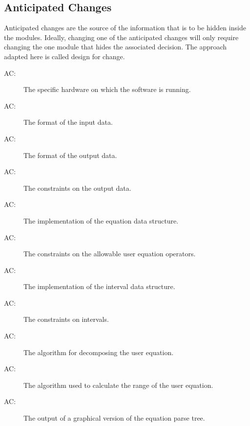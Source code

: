 \documentclass[12pt, titlepage]{article}
\newcounter{acnum}
\newcommand{\actheacnum}{AC\theacnum}
\begin{document}
\subsection{Anticipated Changes} \label{SecAchange}

Anticipated changes are the source of the information that is to be hidden
inside the modules. Ideally, changing one of the anticipated changes will only
require changing the one module that hides the associated decision. The approach
adapted here is called design for change.

\begin{description}
\item[ \actheacnum \label{acHardware}:] The specific
  hardware on which the software is running.
  
\item[ \actheacnum \label{acInput}:] The format of 
the input data.

\item[ \actheacnum \label{acOutput}:] The format of 
the output data.

\item[ \actheacnum \label{acOutputConstraints}:] The 
constraints on the output data.

\item[ \actheacnum \label{acEquationStruct}:] The 
implementation of the equation data structure.

\item[ \actheacnum \label{acEquationConstraints}:] The 
constraints on the allowable user equation operators.

\item[ \actheacnum \label{acIntervalStruct}:] The 
implementation of the interval data structure.

\item[ \actheacnum \label{acIntervalConstraints}:] The 
constraints on intervals.

\item[ \actheacnum \label{acParsing}:] The algorithm for 
decomposing the user equation.

\item[ \actheacnum \label{acCalculationAlgorithm}:] The 
algorithm used to calculate the range of the user equation.

\item[ \actheacnum \label{acViewParse}:] The output of a 
graphical version of the equation parse tree.


\end{description}
\end{document}
